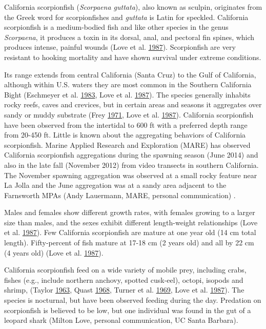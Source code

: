 \documentclass[12pt,]{article}
\begin{document}
California scorpionfish (\emph{Scorpaena guttata}), also known as
sculpin, originates from the Greek word for scorpionfishes and
\emph{guttata} is Latin for speckled. California scorpionfish is a
medium-bodied fish and like other species in the genus \emph{Scorpaena},
it produces a toxin in its dorsal, anal, and pectoral fin spines, which
produces intense, painful wounds (Love et al.
\protect\hyperlink{ref-Love1987}{1987}). Scorpionfish are very resistant
to hooking mortality and have shown survival under extreme conditions.

Its range extends from central California (Santa Cruz) to the Gulf of
California, although within U.S. waters they are most common in the
Southern California Bight (Eschmeyer et al.
\protect\hyperlink{ref-Eschmeyer1983}{1983}, Love et al.
\protect\hyperlink{ref-Love1987}{1987}). The species generally inhabits
rocky reefs, caves and crevices, but in certain areas and seasons it
aggregates over sandy or muddy substrate (Frey
\protect\hyperlink{ref-Frey1971}{1971}, Love et al.
\protect\hyperlink{ref-Love1987}{1987}). California scorpionfish have
been observed from the intertidal to 600 ft with a preferred depth range
from 20-450 ft. Little is known about the aggregating behaviors of
California scorpionfish. Marine Applied Research and Exploration (MARE)
has observed California scorpionfish aggregations during the spawning
season (June 2014) and also in the late fall (November 2012) from video
transects in southern California. The November spawning aggregation was
observed at a small rocky feature near La Jolla and the June aggregation
was at a sandy area adjacent to the Farnsworth MPAs (Andy Lauermann,
MARE, personal communication) .

Males and females show different growth rates, with females growing to a
larger size than males, and the sexes exhibit different length-weight
relationships (Love et al. \protect\hyperlink{ref-Love1987}{1987}). Few
California scorpionfish are mature at one year old (14 cm total length).
Fifty-percent of fish mature at 17-18 cm (2 years old) and all by 22 cm
(4 years old) (Love et al. \protect\hyperlink{ref-Love1987}{1987}).

California scorpionfish feed on a wide variety of mobile prey, including
crabs, fishes (e.g., include northern anchovy, spotted cusk-eel),
octopi, isopods and shrimp, (Taylor
\protect\hyperlink{ref-Taylor1963}{1963}, Quast
\protect\hyperlink{ref-Quast1968}{1968}, Turner et al.
\protect\hyperlink{ref-Turner1969}{1969}, Love et al.
\protect\hyperlink{ref-Love1987}{1987}). The species is nocturnal, but
have been observed feeding during the day. Predation on scorpionfish is
believed to be low, but one individual was found in the gut of a leopard
shark (Milton Love, personal communication, UC Santa Barbara).
\end{document}
